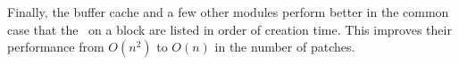 
Finally, the buffer cache and a few other modules perform better in the
common case that the \patches\ on a block are listed in order of creation
time.
%
This improves their performance from $O(n^2)$ to $O(n)$ in the number of
patches.


\begin{comment}
Several functions in \Kudos\ iterate over lists of \chdescs\ looking for either
a single \chdesc\ or set of \chdescs\ satisfying some property, or trying to
process all the \chdescs\ in the list in some order determined by the dependency
graph. It is generally the case that the \chdescs\ satisfying the property or
the order in which the \chdescs\ should be processed can be determined very
quickly by keeping the lists sorted. For instance, the library function which
rolls \chdescs\ back needs to perform the rollbacks essentially in inverse
creation order, so that rolling back a \chdesc\ which has since been overwritten
by a later \chdesc\ does the right thing. Keeping the list of all \chdescs\ on a
block sorted in creation order (which is very easy) makes this an efficient
operation, while it might otherwise take $O(n^2)$ time to execute. Similarly,
many \chdesc\ merging functions need to find for a given block some \chdesc\
which has no \befores\ on the same block, and the oldest \chdesc\ on a block
always satisfies this requirement.
\end{comment}
